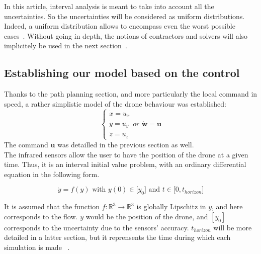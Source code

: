 \documentclass[letterpaper, 10 pt, conference]{ieeeconf}  %
\begin{document}
In this article, interval analysis is meant to take into account all the uncertainties. So the uncertainties will be considered as uniform distributions. Indeed, a uniform distribution allows to encompass even the worst possible cases~\cite{Reliabilty}.
Without going in depth, the notions of contractors and solvers will also implicitely be used in the next section~\cite{Jaulin}.

\subsection{Establishing our model based on the control}
Thanks to the path planning section, and more particularly the local command in speed, a rather simplistic model of the drone behaviour was established:
\begin{equation}
    \left\{
    \begin{array}{ll}
        \dot{x} = u_{x} \\
        \dot{y} = u_{y} \\
        \dot{z} = u_{z}
    \end{array}
    \textit{or } \dot{\textbf{w}} = \textbf{u}
    \right.
\end{equation}
The command $\textbf{u}$ was detailled in the previous section as well.\\
The infrared sensors allow the user to have the position of the drone at a given time. Thus, it is an interval initial value problem, with an ordinary differential equation in the following form.

\begin{equation}
    \dot{y} = f(y) \text{ with } y(0) \in \lbrack y_{0} \rbrack \text{ and } t \in \lbrack 0,t_{horizon} \rbrack
\end{equation}

It is assumed that the function $f : \mathbb{R}^{3} \rightarrow \mathbb{R}^{3}$ is globally Lipschitz in $y$, and here corresponds to the flow. $y$ would be the position of the drone, and $[y_{0}]$ corresponds to the uncertainty due to the sensors' accuracy. $t_{horizon}$ will be more detailed in a latter section, but it reprensents the time during which each simulation is made~ \cite{Sandretto}.\\
\end{document}
